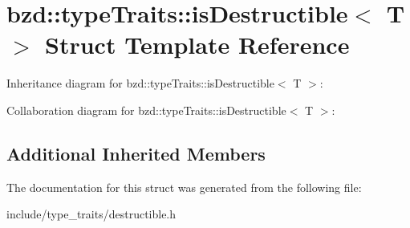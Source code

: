 \hypertarget{structbzd_1_1typeTraits_1_1isDestructible}{}\section{bzd\+:\+:type\+Traits\+:\+:is\+Destructible$<$ T $>$ Struct Template Reference}
\label{structbzd_1_1typeTraits_1_1isDestructible}


Inheritance diagram for bzd\+:\+:type\+Traits\+:\+:is\+Destructible$<$ T $>$\+:


Collaboration diagram for bzd\+:\+:type\+Traits\+:\+:is\+Destructible$<$ T $>$\+:
\subsection*{Additional Inherited Members}


The documentation for this struct was generated from the following file\+:\begin{DoxyCompactItemize}
\item 
include/type\+\_\+traits/destructible.\+h\end{DoxyCompactItemize}

